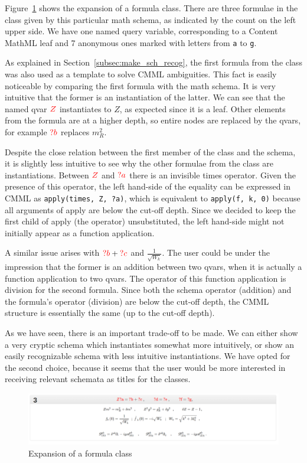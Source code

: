 \documentclass[a4paper,11pt,oneside]{article}
\def\red#1{\textcolor{red}{#1}}
\def\cmml{\textsf{Content MathML}\xspace}
\begin{document}
Figure~\ref{fig:schema_instantiation} shows the expansion of a formula class.
There are three formulae in the class given by this particular math schema, as
indicated by the count on the left upper side. We have one named query
variable, corresponding to a \cmml leaf and 7 anonymous ones marked with
letters from \verb|a| to \verb|g|. 

As explained in Section~\ref{subsec:make_sch_recog}, the first formula from the
class was also used as a template to solve CMML ambiguities. This fact is
easily noticeable by comparing the first formula with the math schema. It is
very intuitive that the former is an instantiation of the latter. We can see
that the named qvar $\red{Z}$ instantiates to $Z$, as expected since it is a
leaf. Other elements from the formula are at a higher depth, so entire
nodes are replaced by the qvars, for example $\red{?b}$ replaces $m^{2}_{R}$.

Despite the close relation between the first member of the class and the
schema, it is slightly less intuitive to see why the other formulae from the
class are instantiations. Between $\red{Z}$ and $\red{?a}$ there is an
invisible times operator. Given the presence of this operator, the left
hand-side of the equality can be expressed in CMML as
\verb|apply(times, Z, ?a)|, which is equivalent to \verb|apply(f, k, 0)|
because all arguments of apply are below the cut-off depth. Since we decided to
keep the first child of apply (the operator) unsubstituted, the left hand-side
might not initially appear as a function application.

A similar issue arises with $\red{?b} + \red{?c}$ and $\frac{1}{\sqrt{W_k}}$.
The user could be under the impression that the former is an addition between
two qvars, when it is actually a function application to two qvars. The
operator of this function application is division for the second formula.
Since both the schema operator (addition) and the formula's operator (division)
are below the cut-off depth, the CMML structure is essentially the same (up to
the cut-off depth).

As we have seen, there is an important trade-off to be made. We can either show
a very cryptic schema which instantiates somewhat more intuitively, or show an
easily recognizable schema with less intuitive instantiations. We have opted
for the second choice, because it seems that the user would be more interested
in receiving relevant schemata as titles for the classes.

\begin{figure}[ht]\centering
    \includegraphics[width=12.8cm]{img/schemaInstantiation.png}
    \caption{Expansion of a formula class}\label{fig:schema_instantiation}
\end{figure}
\end{document}
